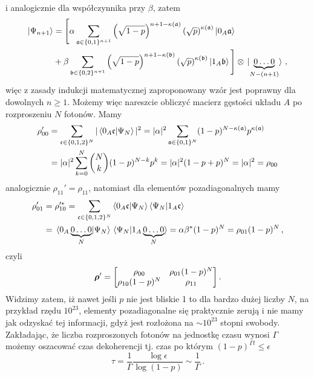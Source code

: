 \documentclass{myclass}
\begin{document}
i analogicznie dla współczynnika przy \(\beta\), zatem
\begin{equation*}
    \begin{split}
        \ket{\Psi_{n+1}} &= \Bigg[\alpha\sum_{\mathfrak{a}\in\{0,1\}^{n+1}}\left(\sqrt{1-p}\right)^{n+1-\kappa(\mathfrak{a})}\left(\sqrt{p}\right)^{\kappa(\mathfrak{a})}\ket{0_A\mathfrak{a}} \\
        &+ \beta\sum_{\mathfrak{b}\in\{0,2\}^{n+1}}\left(\sqrt{1-p}\right)^{n+1-\kappa(\mathfrak{b})}\left(\sqrt{p}\right)^{\kappa(\mathfrak{b})}\ket{1_A\mathfrak{b}} \Bigg] \otimes \ket*{\underbrace{0\ldots 0}_{N-(n+1)}}\,,
    \end{split}
\end{equation*}
więc z zasady indukcji matematycznej zaproponowany wzór jest poprawny dla dowolnych \(n \geq 1\).
Możemy więc nareszcie obliczyć macierz gęstości układu \(A\) po rozproszeniu \(N\) fotonów. Mamy
\begin{equation*}
    \begin{split}
        \rho_{00}' &= \sum_{\mathfrak{c} \in \{0,1,2\}^N} |\braket{0_A\mathfrak{c}}{\Psi_N}|^2 = |\alpha|^2\sum_{\mathfrak{a} \in \{0,1\}^N}(1-p)^{N-\kappa(\mathfrak{a})}p^{\kappa(\mathfrak{a})} \\
        &= |\alpha|^2\sum_{k=0}^N {N \choose k} (1-p)^{N-k}p^k = |\alpha|^2(1-p+p)^N = |\alpha|^2 = \rho_{00}
    \end{split}
\end{equation*}
analogicznie \(\rho_{11}' = \rho_{11}\), natomiast dla elementów pozadiagonalnych mamy
\begin{equation*}
    \begin{split}
        \rho_{01}' &= \rho_{10}'^* = \sum_{\mathfrak{c} \in \{0,1,2\}^N} \braket{0_A\mathfrak{c}}{\Psi_N}\braket{\Psi_N}{1_A\mathfrak{c}} \\
        &= \braket*{0_A\underbrace{0\ldots0}_N}{\Psi_N}\braket*{\Psi_N}{1_A\underbrace{0\ldots0}_N} = \alpha\beta^*(1-p)^N = \rho_{01}(1-p)^N\,,
    \end{split}
\end{equation*}
czyli
\begin{equation*}
    \oper{\rho}' = \mqty[\rho_{00} & \rho_{01}(1-p)^N \\ \rho_{10}(1-p)^N & \rho_{11}]\,.
\end{equation*}
Widzimy zatem, iż nawet jeśli \(p\) nie jest bliskie 1 to dla bardzo dużej liczby \(N\), na przykład
rzędu \(10^{23}\), elementy pozadiagonalne się praktycznie zerują i nie mamy jak odzyskać tej
informacji, gdyż jest rozłożona na \(\sim 10^{23}\) stopni swobody. Zakładając, że liczba
rozproszonych fotonów na jednostkę czasu wynosi \(\Gamma\) możemy oszacować czas dekoherencji tj.
czas po którym \((1-p)^{\Gamma t} \leq \epsilon\)
\begin{equation*}
    \tau = \frac{1}{\Gamma}\frac{\log\epsilon}{\log(1-p)} \sim \frac{1}{\Gamma}\,.
\end{equation*}
\end{document}
